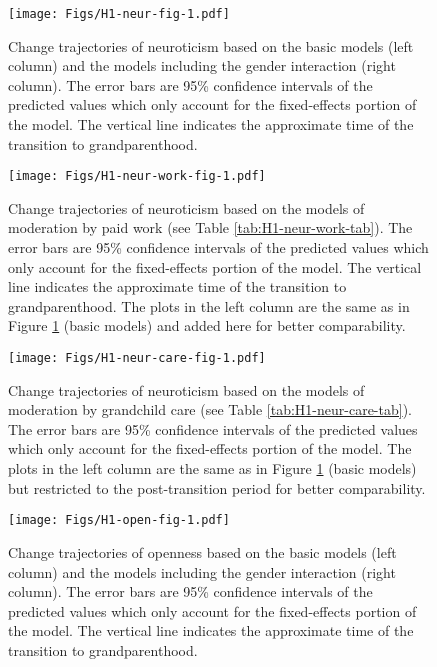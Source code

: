 \documentclass[
  english,
  man, noextraspace]{apa7}
\begin{document}
\begin{appendix}
\begin{figure}
\centering
\texttt{[image: Figs/H1-neur-fig-1.pdf]}
\caption{\label{fig:H1-neur-fig}Change trajectories of neuroticism based on the
basic models (left column) and the models including the gender
interaction (right column). The error bars are 95\% confidence intervals
of the predicted values which only account for the fixed-effects portion
of the model. The vertical line indicates the approximate time of the
transition to grandparenthood.}
\end{figure}










\begin{figure}
\centering
\texttt{[image: Figs/H1-neur-work-fig-1.pdf]}
\caption{\label{fig:H1-neur-work-fig}Change trajectories of neuroticism based on
the models of moderation by paid work (see Table
\ref{tab:H1-neur-work-tab}). The error bars are 95\% confidence
intervals of the predicted values which only account for the
fixed-effects portion of the model. The vertical line indicates the
approximate time of the transition to grandparenthood. The plots in the
left column are the same as in Figure \ref{fig:H1-neur-fig} (basic
models) and added here for better comparability.}
\end{figure}









\begin{figure}
\centering
\texttt{[image: Figs/H1-neur-care-fig-1.pdf]}
\caption{\label{fig:H1-neur-care-fig}Change trajectories of neuroticism based on
the models of moderation by grandchild care (see Table
\ref{tab:H1-neur-care-tab}). The error bars are 95\% confidence
intervals of the predicted values which only account for the
fixed-effects portion of the model. The plots in the left column are the
same as in Figure \ref{fig:H1-neur-fig} (basic models) but restricted to
the post-transition period for better comparability.}
\end{figure}








\begin{figure}
\centering
\texttt{[image: Figs/H1-open-fig-1.pdf]}
\caption{\label{fig:H1-open-fig}Change trajectories of openness based on the basic
models (left column) and the models including the gender interaction
(right column). The error bars are 95\% confidence intervals of the
predicted values which only account for the fixed-effects portion of the
model. The vertical line indicates the approximate time of the
transition to grandparenthood.}
\end{figure}











\end{appendix}
\end{document}
